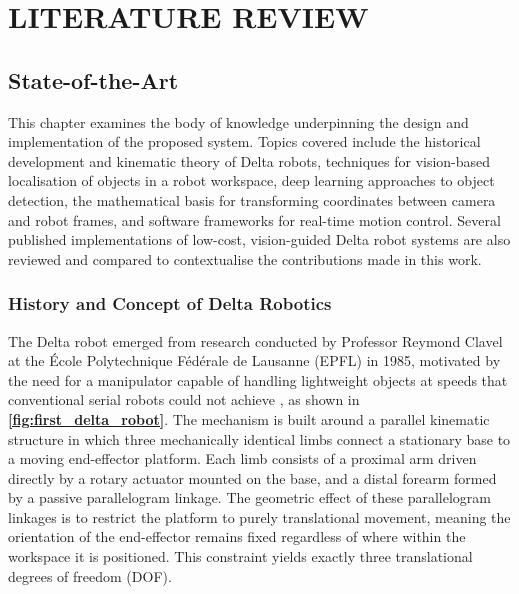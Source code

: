 
\section{LITERATURE REVIEW}

\subsection{State-of-the-Art}
\hspace{1.27cm}
This chapter examines the body of knowledge underpinning the design and
implementation of the proposed system. Topics covered include the
historical development and kinematic theory of Delta robots, techniques
for vision-based localisation of objects in a robot workspace, deep
learning approaches to object detection, the mathematical basis for
transforming coordinates between camera and robot frames, and
software frameworks for real-time motion control. Several published
implementations of low-cost, vision-guided Delta robot systems are
also reviewed and compared to contextualise the contributions made in
this work.

\subsubsection{History and Concept of Delta Robotics}
\hspace{1.27cm}
The Delta robot emerged from research conducted by Professor Reymond
Clavel at the \'{E}cole Polytechnique F\'{e}d\'{e}rale de Lausanne
(EPFL) in 1985, motivated by the need for a manipulator capable of
handling lightweight objects at speeds that conventional serial robots
could not achieve \autocite{clavel-1990}, as shown in
\textbf{\autoref{fig:first_delta_robot}}. The mechanism is built
around a parallel kinematic structure in which three mechanically
identical limbs connect a stationary base to a moving end-effector
platform. Each limb consists of a proximal arm driven directly by a
rotary actuator mounted on the base, and a distal forearm formed by a
passive parallelogram linkage. The geometric effect of these
parallelogram linkages is to restrict the platform to purely
translational movement, meaning the orientation of the end-effector
remains fixed regardless of where within the workspace it is
positioned. This constraint yields exactly three translational degrees
of freedom (DOF).

